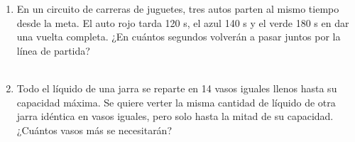\documentclass[11pt,letterpaper]{article}
\newenvironment{alternativas}{%
\begin{enumerate}[label=\Alph*), leftmargin=14pt, itemsep=2pt, topsep=2pt]
}{\end{enumerate}}
\begin{document}
\begin{enumerate}[label=\textbf{\arabic*.}, leftmargin=*, itemsep=7pt]
\item
\begin{minipage}[t]{\linewidth}
En un circuito de carreras de juguetes, tres autos parten al mismo tiempo desde la meta. El auto rojo tarda 120 s, el azul 140 s y el verde 180 s en dar una vuelta completa. ¿En cuántos segundos volverán a pasar juntos por la línea de partida?\\
\\%
\begin{minipage}{\linewidth}
\vspace{7mm}
\end{minipage}
\vspace{7mm}
\end{minipage}

\item
\begin{minipage}[t]{\linewidth}
Todo el líquido de una jarra se reparte en 14 vasos iguales llenos hasta su capacidad máxima. Se quiere verter la misma cantidad de líquido de otra jarra idéntica en vasos iguales, pero solo hasta la mitad de su capacidad. ¿Cuántos vasos más se necesitarán?\\
\\%
\begin{minipage}{\linewidth}
\vspace{7mm}
\end{minipage}
\vspace{7mm}
\end{minipage}


\end{enumerate}
\end{document}
